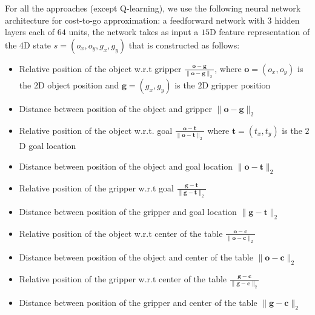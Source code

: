 For all the approaches (except Q-learning), we use
the following neural network architecture for cost-to-go
approximation: a feedforward network with 3 hidden layers each of $64$
units, the network takes as input a $15$D feature representation of the 4D
state $s = (o_x, o_y, g_x, g_y)$ that is constructed as follows:
\begin{itemize}
\item Relative position of the object w.r.t gripper $\frac{\mathbf{o}
    - \mathbf{g}}{\|\mathbf{o} - \mathbf{g}\|_2}$, where $\mathbf{o} =
  (o_x, o_y)$ is the $2$D object position and $\mathbf{g} = (g_x,
  g_y)$ is the $2$D gripper position
\item Distance between position of the object and gripper
  $\|\mathbf{o} - \mathbf{g}\|_2$
\item Relative position of the object w.r.t. goal $\frac{\mathbf{o} -
    \mathbf{t}}{\|\mathbf{o} - \mathbf{t}\|_2}$ where $\mathbf{t} =
  (t_x, t_y)$ is the $2$D goal location
\item Distance between position of the object and goal location
  $\|\mathbf{o} - \mathbf{t}\|_2$
\item Relative position of the gripper w.r.t goal $\frac{\mathbf{g} -
    \mathbf{t}}{\|\mathbf{g} - \mathbf{t}\|_2}$
\item Distance between position of the gripper and goal location
  $\|\mathbf{g} - \mathbf{t}\|_2$
\item Relative position of the object w.r.t center of the table
  $\frac{\mathbf{o} - \mathbf{c}}{\|\mathbf{o} - \mathbf{c}\|_2}$
\item Distance between position of the object and center of the table
  ${\|\mathbf{o} - \mathbf{c}\|_2}$
\item Relative position of the gripper w.r.t center of the table
  $\frac{\mathbf{g} - \mathbf{c}}{\|\mathbf{g} - \mathbf{c}\|_2}$
\item Distance between position of the gripper and center of the table
  ${\|\mathbf{g} - \mathbf{c}\|_2}$
\end{itemize}

